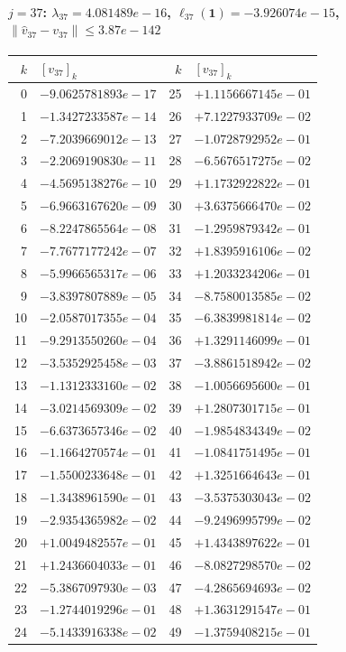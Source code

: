\documentclass[11pt]{article}
\begin{document}
\paragraph{$j = 37$: $\lambda_{37} = 4.081489e-16$, \quad $\ell_{37}(\mathbf{1}) = -3.926074e-15$, \quad $\|\hat v_{37} - v_{37}\| \leq 3.87e-142$}
\begin{center}
{\footnotesize
\begin{tabular}{r@{\;\;}l@{\quad}r@{\;\;}l}
\toprule
$k$ & $[v_{37}]_k$ & $k$ & $[v_{37}]_k$ \\
\midrule
0 & $-9.0625781893e-17$ & 25 & $+1.1156667145e-01$ \\
1 & $-1.3427233587e-14$ & 26 & $+7.1227933709e-02$ \\
2 & $-7.2039669012e-13$ & 27 & $-1.0728792952e-01$ \\
3 & $-2.2069190830e-11$ & 28 & $-6.5676517275e-02$ \\
4 & $-4.5695138276e-10$ & 29 & $+1.1732922822e-01$ \\
5 & $-6.9663167620e-09$ & 30 & $+3.6375666470e-02$ \\
6 & $-8.2247865564e-08$ & 31 & $-1.2959879342e-01$ \\
7 & $-7.7677177242e-07$ & 32 & $+1.8395916106e-02$ \\
8 & $-5.9966565317e-06$ & 33 & $+1.2033234206e-01$ \\
9 & $-3.8397807889e-05$ & 34 & $-8.7580013585e-02$ \\
10 & $-2.0587017355e-04$ & 35 & $-6.3839981814e-02$ \\
11 & $-9.2913550260e-04$ & 36 & $+1.3291146099e-01$ \\
12 & $-3.5352925458e-03$ & 37 & $-3.8861518942e-02$ \\
13 & $-1.1312333160e-02$ & 38 & $-1.0056695600e-01$ \\
14 & $-3.0214569309e-02$ & 39 & $+1.2807301715e-01$ \\
15 & $-6.6373657346e-02$ & 40 & $-1.9854834349e-02$ \\
16 & $-1.1664270574e-01$ & 41 & $-1.0841751495e-01$ \\
17 & $-1.5500233648e-01$ & 42 & $+1.3251664643e-01$ \\
18 & $-1.3438961590e-01$ & 43 & $-3.5375303043e-02$ \\
19 & $-2.9354365982e-02$ & 44 & $-9.2496995799e-02$ \\
20 & $+1.0049482557e-01$ & 45 & $+1.4343897622e-01$ \\
21 & $+1.2436604033e-01$ & 46 & $-8.0827298570e-02$ \\
22 & $-5.3867097930e-03$ & 47 & $-4.2865694693e-02$ \\
23 & $-1.2744019296e-01$ & 48 & $+1.3631291547e-01$ \\
24 & $-5.1433916338e-02$ & 49 & $-1.3759408215e-01$ \\
\bottomrule
\end{tabular}
}
\end{center}
\end{document}
